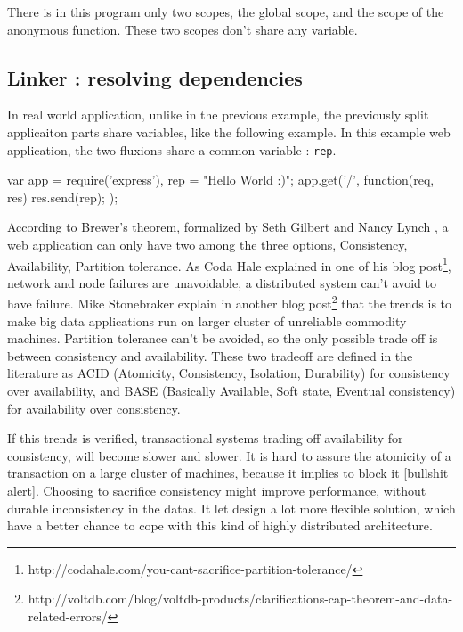 
There is in this program only two scopes, the global scope, and the scope of the anonymous function.
These two scopes don't share any variable.

\subsection{Linker : resolving dependencies} \label{ss:linker}

In real world application, unlike in the previous example, the previously split applicaiton parts share variables, like the following example.
In this example web application, the two fluxions share a common variable : \texttt{rep}.

\begin{code}[Javascript, caption={Hello World with a shared variable},label={lst:sharedhello}]
var app = require('express'),
    rep = "Hello World :)";
app.get('/', function(req, res) {
  res.send(rep);
});
\end{code}

According to Brewer's theorem, formalized by Seth Gilbert and Nancy Lynch \cite{Gilbert2002}, a web application can only have two among the three options, Consistency, Availability, Partition tolerance.
As Coda Hale explained in one of his blog post\footnote{http://codahale.com/you-cant-sacrifice-partition-tolerance/}, network and node failures are unavoidable, a distributed system can't avoid to have failure.
Mike Stonebraker explain in another blog post\footnote{http://voltdb.com/blog/voltdb-products/clarifications-cap-theorem-and-data-related-errors/} that the trends is to make big data applications run on larger cluster of unreliable commodity machines.
Partition tolerance can't be avoided, so the only possible trade off is between consistency and availability.
These two tradeoff are defined in the literature as ACID (Atomicity, Consistency, Isolation, Durability) for consistency over availability, and BASE (Basically Available, Soft state, Eventual consistency) for availability over consistency.

If this trends is verified, transactional systems trading off availability for consistency, will become slower and slower.
It is hard to assure the atomicity of a transaction on a large cluster of machines, because it implies to block it [bullshit alert].
Choosing to sacrifice consistency might improve performance, without durable inconsistency in the datas.
It let design a lot more flexible solution, which have a better chance to cope with this kind of highly distributed architecture.


